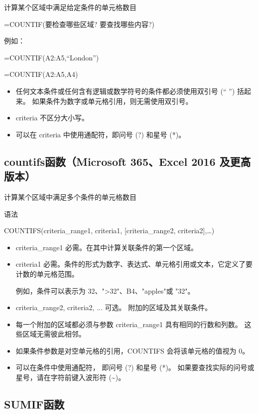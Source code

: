 计算某个区域中满足给定条件的单元格数目

=COUNTIF(要检查哪些区域? 要查找哪些内容?)

例如：

=COUNTIF(A2:A5,``London'')

=COUNTIF(A2:A5,A4)

\begin{itemize}
    \item 任何文本条件或任何含有逻辑或数学符号的条件都必须使用双引号 (`` \quad '') 括起来。 如果条件为数字或单元格引用，则无需使用双引号。
    \item criteria 不区分大小写。
    \item 可以在 criteria 中使用通配符，即问号 (?) 和星号 (*)。 
\end{itemize}

\subsection{countifs函数（Microsoft 365、Excel 2016 及更高版本）}

计算某个区域中满足多个条件的单元格数目

语法

COUNTIFS(criteria\_range1, criteria1, [criteria\_range2, criteria2],…)

\begin{itemize}
    \item criteria\_range1 必需。在其中计算关联条件的第一个区域。
    \item criteria1 必需。条件的形式为数字、表达式、单元格引用或文本，它定义了要计数的单元格范围。
    
    例如，条件可以表示为 32、">32"、B4、"apples"或 "32"。
    \item criteria\_range2, criteria2, ...    可选。 附加的区域及其关联条件。
    \item 每一个附加的区域都必须与参数 criteria\_range1 具有相同的行数和列数。 这些区域无需彼此相邻。
    \item 如果条件参数是对空单元格的引用，COUNTIFS 会将该单元格的值视为 0。
    \item 可以在条件中使用通配符， 即问号 (?) 和星号 (*)。 如果要查找实际的问号或星号，请在字符前键入波形符 (\textasciitilde)。
\end{itemize}

\subsection{SUMIF函数}


